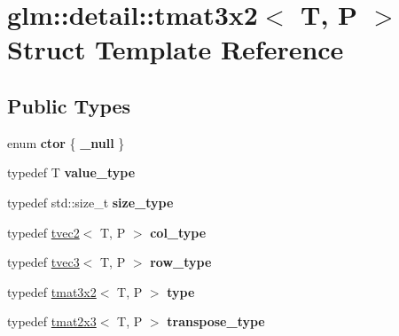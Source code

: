 \hypertarget{structglm_1_1detail_1_1tmat3x2}{}\section{glm\+:\+:detail\+:\+:tmat3x2$<$ T, P $>$ Struct Template Reference}
\label{structglm_1_1detail_1_1tmat3x2}
\subsection*{Public Types}
\begin{DoxyCompactItemize}
\item 
enum {\bfseries ctor} \{ {\bfseries \+\_\+null}
 \}\hypertarget{structglm_1_1detail_1_1tmat3x2_ae8783ababf4eb06fdbb048bb90ef3b03}{}\label{structglm_1_1detail_1_1tmat3x2_ae8783ababf4eb06fdbb048bb90ef3b03}

\item 
typedef T {\bfseries value\+\_\+type}\hypertarget{structglm_1_1detail_1_1tmat3x2_a3a0297927f3affe894622f9496b66db4}{}\label{structglm_1_1detail_1_1tmat3x2_a3a0297927f3affe894622f9496b66db4}

\item 
typedef std\+::size\+\_\+t {\bfseries size\+\_\+type}\hypertarget{structglm_1_1detail_1_1tmat3x2_af70231300959702a284387cd047e5802}{}\label{structglm_1_1detail_1_1tmat3x2_af70231300959702a284387cd047e5802}

\item 
typedef \hyperlink{structglm_1_1detail_1_1tvec2}{tvec2}$<$ T, P $>$ {\bfseries col\+\_\+type}\hypertarget{structglm_1_1detail_1_1tmat3x2_a9c0f2cfe8e359b2917b5f616a5dbc9e4}{}\label{structglm_1_1detail_1_1tmat3x2_a9c0f2cfe8e359b2917b5f616a5dbc9e4}

\item 
typedef \hyperlink{structglm_1_1detail_1_1tvec3}{tvec3}$<$ T, P $>$ {\bfseries row\+\_\+type}\hypertarget{structglm_1_1detail_1_1tmat3x2_a4e9b5f959b95a291c070d0f60195306f}{}\label{structglm_1_1detail_1_1tmat3x2_a4e9b5f959b95a291c070d0f60195306f}

\item 
typedef \hyperlink{structglm_1_1detail_1_1tmat3x2}{tmat3x2}$<$ T, P $>$ {\bfseries type}\hypertarget{structglm_1_1detail_1_1tmat3x2_ae5d42d3fe65b97066f5a74e2da7015e3}{}\label{structglm_1_1detail_1_1tmat3x2_ae5d42d3fe65b97066f5a74e2da7015e3}

\item 
typedef \hyperlink{structglm_1_1detail_1_1tmat2x3}{tmat2x3}$<$ T, P $>$ {\bfseries transpose\+\_\+type}\hypertarget{structglm_1_1detail_1_1tmat3x2_acb1e7f53f46b54ebb6699582fa1c4b71}{}\label{structglm_1_1detail_1_1tmat3x2_acb1e7f53f46b54ebb6699582fa1c4b71}

\end{DoxyCompactItemize}
